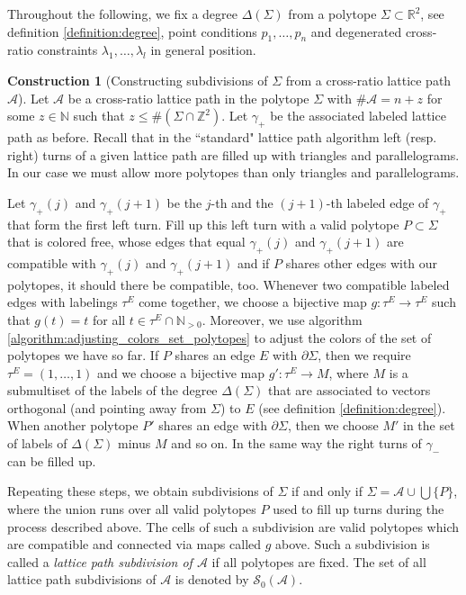 \documentclass[11pt,reqno,a4]{amsart}
\theoremstyle{dotless}
\theoremstyle{definition}
\newtheorem{construction}[corollary]{Construction}
\begin{document}
Throughout the following, we fix a degree $\Delta(\Sigma)$ from a polytope $\Sigma\subset\mathbb{R}^2$, see definition \ref{definition:degree}, point conditions $p_1,\dots,p_n$ and degenerated cross-ratio constraints $\lambda_1,\dots,\lambda_l$ in general position.


\begin{construction}[Constructing subdivisions of $\Sigma$ from a cross-ratio lattice path $\mathcal{A}$]\label{construction:subdivisions_from_lattice_path}
Let $\mathcal{A}$ be a cross-ratio lattice path in the polytope $\Sigma$ with $\#\mathcal{A}=n+z$ for some $z\in\mathbb{N}$ such that $z\leq\#\left(\Sigma\cap\mathbb{Z}^2\right)$. Let $\gamma_+$ be the associated labeled lattice path as before. Recall that in the ``standard" lattice path algorithm left (resp. right) turns of a given lattice path are filled up with triangles and parallelograms. In our case we must allow more polytopes than only triangles and parallelograms.

Let $\gamma_+(j)$ and $\gamma_+(j+1)$ be the $j$-th and the $(j+1)$-th labeled edge of $\gamma_+$ that form the first left turn. Fill up this left turn with a valid polytope $P\subset\Sigma$ that is colored free, whose edges that equal $\gamma_+(j)$ and $\gamma_+(j+1)$ are compatible with $\gamma_+(j)$ and $\gamma_+(j+1)$ and if $P$ shares other edges with our polytopes, it should there be compatible, too. Whenever two compatible labeled edges with labelings $\tau^E$ come together, we choose a bijective map $g:\tau^E\to\tau^E$ such that $g(t)=t$ for all $t\in\tau^E\cap\mathbb{N}_{>0}$. Moreover, we use algorithm \ref{algorithm:adjusting_colors_set_polytopes} to adjust the colors of the set of polytopes we have so far. If $P$ shares an edge $E$ with $\partial \Sigma$, then we require $\tau^E=\left( 1,\dots, 1\right)$ and we choose a bijective map $g':\tau^E\to M$, where $M$ is a submultiset of the labels of the degree $\Delta(\Sigma)$ that are associated to vectors orthogonal (and pointing away from $\Sigma$) to $E$ (see definition \ref{definition:degree}). When another polytope $P'$ shares an edge with $\partial \Sigma$, then we choose $M'$ in the set of labels of $\Delta(\Sigma)$ minus $M$ and so on. In the same way the right turns of $\gamma_-$ can be filled up.

Repeating these steps, we obtain subdivisions of $\Sigma$ if and only if $\Sigma=\mathcal{A}\cup\bigcup \lbrace P\rbrace$, where the union runs over all valid polytopes $P$ used to fill up turns during the process described above. The cells of such a subdivision are valid polytopes which are compatible and connected via maps called $g$ above. Such a subdivision is called a \textit{lattice path subdivision of $\mathcal{A}$} if all polytopes are fixed. The set of all lattice path subdivisions of $\mathcal{A}$ is denoted by $\mathcal{S}_0(\mathcal{A})$.
\end{construction}
\end{document}
